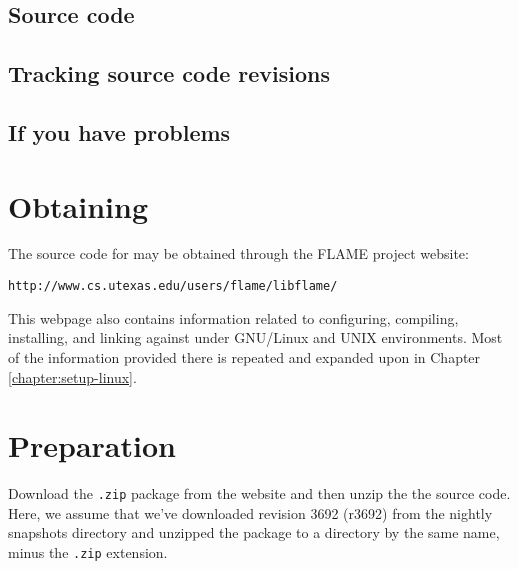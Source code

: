 \subsection{Source code}






\subsection{Tracking source code revisions}





\subsection{If you have problems}





\section{Obtaining \libflame}


The source code for \libflame may be obtained through the FLAME project
website:

\begin{Verbatim}[frame=none,framesep=2.5mm,xleftmargin=5mm,commandchars=\\\{\},fontsize=\normalsize]
http://www.cs.utexas.edu/users/flame/libflame/
\end{Verbatim}

\noindent
This webpage also contains information related to configuring,
compiling, installing, and linking against \libflame under GNU/Linux
and UNIX environments.
Most of the information provided there is repeated and expanded upon in
Chapter \ref{chapter:setup-linux}.



\section{Preparation}

Download the {\tt .zip} package from the website and then unzip the
the source code.
Here, we assume that we've downloaded revision 3692 (r3692) from the
nightly snapshots directory and unzipped the package to a directory by
the same name, minus the {\tt .zip} extension.

